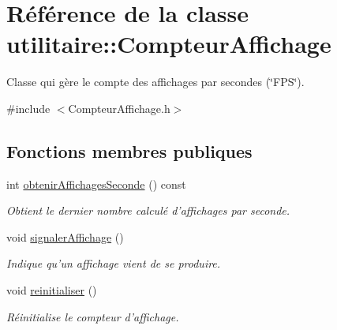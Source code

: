\hypertarget{classutilitaire_1_1_compteur_affichage}{\section{Référence de la classe utilitaire\-:\-:Compteur\-Affichage}
\label{classutilitaire_1_1_compteur_affichage}
}


Classe qui gère le compte des affichages par secondes (\char`\"{}\-F\-P\-S\char`\"{}).  




{\ttfamily \#include $<$Compteur\-Affichage.\-h$>$}

\subsection*{Fonctions membres publiques}
\begin{DoxyCompactItemize}
\item 
int \hyperlink{classutilitaire_1_1_compteur_affichage_a1902a495b4898b3f7ab9056537db00cc}{obtenir\-Affichages\-Seconde} () const 
\begin{DoxyCompactList}\small\item\em Obtient le dernier nombre calculé d'affichages par seconde. \end{DoxyCompactList}\item 
void \hyperlink{classutilitaire_1_1_compteur_affichage_a49f6562d1a37e275ff8c8c0e9be41ab5}{signaler\-Affichage} ()
\begin{DoxyCompactList}\small\item\em Indique qu'un affichage vient de se produire. \end{DoxyCompactList}\item 
void \hyperlink{classutilitaire_1_1_compteur_affichage_a69b89a3d76cde700f1c08580bab010ca}{reinitialiser} ()
\begin{DoxyCompactList}\small\item\em Réinitialise le compteur d'affichage. \end{DoxyCompactList}\end{DoxyCompactItemize}
